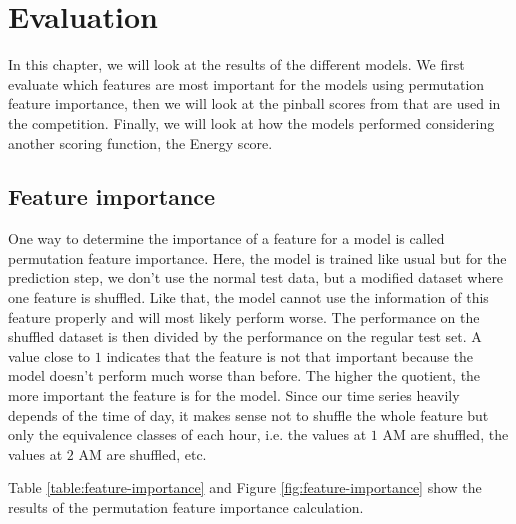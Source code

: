 \chapter{Evaluation}
\label{ch:Evaluation}

In this chapter, we will look at the results of the different models. 
We first evaluate which features are most important for the models using 
permutation feature importance, then we will look at the pinball scores from 
that are used in the competition. Finally, we will look at how the models performed 
considering another scoring function, the Energy score.

\section{Feature importance}

One way to determine the importance of a feature for a model is called 
permutation feature importance. Here, the model is trained like usual but for the prediction 
step, we don't use the normal test data, but a modified dataset where one feature is 
shuffled. Like that, the model cannot use the information of this feature properly 
and will most likely perform worse. The performance on the shuffled dataset is 
then divided by the performance on the regular test set. A value close to \(1\) 
indicates that the feature is not that important because the model doesn't perform 
much worse than before. The higher the quotient, the more important the feature is for the model.
Since our time series heavily depends of the time of day, it makes sense 
not to shuffle the whole feature but only the equivalence classes of each hour, 
i.e. the values at \(1\) AM are shuffled, the values at \(2\) AM are shuffled, etc.

Table \ref{table:feature-importance} and Figure \ref{fig:feature-importance} 
show the results of the permutation feature importance calculation.

